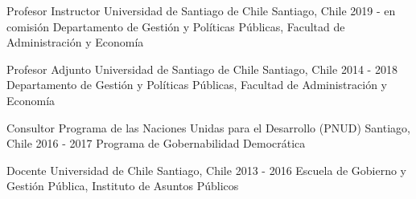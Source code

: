 





\begin{cventries}
\cventry
{Profesor Instructor} 
{Universidad de Santiago de Chile} 
{Santiago, Chile} 
{2019 - en comisión}
{Departamento de Gestión y Políticas Públicas, Facultad de Administración y Economía}\vspace{1.5mm}

\cventry
{Profesor Adjunto} 
{Universidad de Santiago de Chile} 
{Santiago, Chile} 
{2014 - 2018}
{Departamento de Gestión y Políticas Públicas, Facultad de Administración y Economía}\vspace{1.5mm}

\cventry
{Consultor} 
{Programa de las Naciones Unidas para el Desarrollo (PNUD)} 
{Santiago, Chile} 
{2016 - 2017}
{Programa de Gobernabilidad Democrática} \vspace{1.5mm}

\cventry
{Docente} 
{Universidad de Chile} 
{Santiago, Chile} 
{2013 - 2016}
{Escuela de Gobierno y Gestión Pública, Instituto de Asuntos Públicos}\vspace{1.5mm}

\end{cventries}
